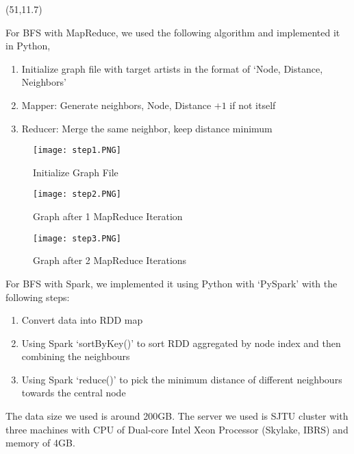 \documentclass[hyperref={pdfpagelabels=false}]{beamer}
\begin{document}
\begin{frame}
\begin{textblock}{40}(51,11.7)
	\begin{basebox}[frogbox,title=Parallel BFS Algorithm, opacitybacktitle=.45, halign title=left]
 		For BFS with MapReduce, we used the following algorithm and implemented it in Python,   
 		\begin{enumerate}
 			\item Initialize graph file with target artists in the format of `Node,  Distance, Neighbors'
 			\item Mapper: Generate neighbors, Node, Distance $+1$ if not itself
 			\item Reducer: Merge the same neighbor, keep distance minimum
 		\end{enumerate}
 		\begin{figure}[H]
		  \center
		  \texttt{[image: step1.PNG]}
		  \caption{Initialize Graph File}
		\endminipage\hfill
		  \center
		  \texttt{[image: step2.PNG]}
		  \caption{Graph after 1 MapReduce Iteration}
		\endminipage\hfill
		  \center
		  \texttt{[image: step3.PNG]}
		  \caption{Graph after 2 MapReduce Iterations}
		\endminipage\hfill
		\end{figure}
 		\vspace{0.1 cm}
 		For BFS with Spark, we implemented it using Python with `PySpark' with the following steps: 
 		\begin{enumerate}
 			\item Convert data into RDD map
 			\item Using Spark `sortByKey()' to sort RDD aggregated by node index and then combining the neighbours
 			\item Using Spark `reduce()' to pick the minimum distance of different neighbours towards the central node
 		\end{enumerate}
		\vspace{0.1 cm}
 		The data size we used is around 200GB. The server we used is SJTU cluster with three machines with CPU of Dual-core Intel Xeon Processor (Skylake, IBRS) and memory of 4GB.
	\end{basebox}
\end{textblock}



\end{frame}
\end{document}
